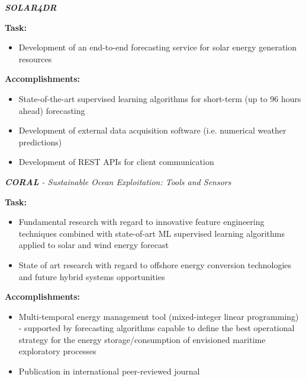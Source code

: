 \documentclass{mycv}
\begin{document}
\begin{myitemize}
	
	\vspace{0.30cm}	
	
	\item \textit{\textbf{SOLAR4DR}}
	
		\vspace{0.15cm}
		\textbf{Task:}
		
		\begin{itemize}[itemsep=1px]
			\item Development of an end-to-end forecasting service for solar energy generation resources
		\end{itemize}
	
		\vspace{0.15cm}
		\textbf{Accomplishments:}
		
		\begin{itemize}[itemsep=1px]
			\item State-of-the-art supervised learning algorithms for short-term (up to 96 hours ahead) forecasting
			\item Development of external data acquisition software (i.e. numerical weather predictions)
			\item Development of REST APIs for client communication
		\end{itemize}
	
	
\vspace{0.15cm}	

	\item \textit{\textbf{CORAL} - Sustainable Ocean Exploitation: Tools and Sensors}

		\vspace{0.15cm}
		\textbf{Task:}

		\begin{itemize}[itemsep=1px]
			\item Fundamental research with regard to innovative feature engineering techniques combined with state-of-art ML supervised learning algorithms applied to solar and wind energy forecast
			\item State of art research with regard to offshore energy conversion technologies and future hybrid systems opportunities
		\end{itemize}
		
		\vspace{0.15cm}
		\textbf{Accomplishments:}
		
		\begin{itemize}[itemsep=1px]
			\item Multi-temporal energy management tool (mixed-integer linear programming) - supported by forecasting algorithms capable to define the best operational strategy for the energy storage/consumption of envisioned maritime exploratory processes
			\item Publication in international peer-reviewed journal
		\end{itemize}
		
		
\end{myitemize}
\end{document}
